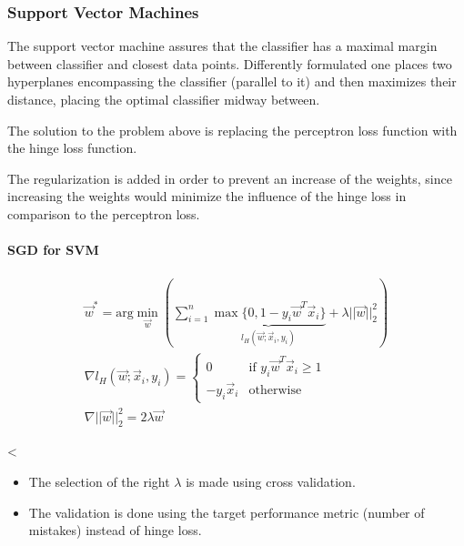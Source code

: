 \documentclass[8pt,a4paper]{scrartcl}
\newcommand{\Argmin}[2]{\text{arg}\underset{#1}{\min}\left(#2\right)}
\begin{document}
\begin{multicols*}{3}
\subsubsection{Support Vector Machines}

The support vector machine assures that the classifier has a maximal margin between classifier and closest data points. Differently formulated one places two hyperplanes encompassing the classifier (parallel to it) and then maximizes their distance, placing the optimal classifier midway between.

The solution to the problem above is replacing the perceptron loss function with the hinge loss function.


\importname{SVM}{$\vec{w}^\ast=\Argmin{\vec{w}}{\sum\limits_{i=1}^n\max\{0,1-y_i\vec{w}^T\vec{x}_i\}+\lambda||\vec{w}||_2^2}$}

The regularization is added in order to prevent an increase of the weights, since increasing the weights would minimize the influence of the hinge loss in comparison to the perceptron loss.

\paragraph{SGD for SVM}

\begin{align*}
\vec{w}^\ast=\Argmin{\vec{w}}{\sum\limits_{i=1}^n\underbrace{\max\{0,1-y_i\vec{w}^T\vec{x}_i\}}_{l_H(\vec{w};\vec{x}_i,y_i)}+\lambda||\vec{w}||_2^2}\\
\nabla l_H(\vec{w};\vec{x}_i,y_i)=\begin{cases}0& \text{if } y_i\vec{w}^T\vec{x}_i\geq 1\\-y_i\vec{x}_i&\text{otherwise}\end{cases}\\
\nabla||\vec{w}||_2^2 = 2\lambda\vec{w}
\end{align*}


<

\begin{itemize}
\ncompaq
\item The selection of the right $\lambda$ is made using cross validation.
\item The validation is done using the target performance metric (number of mistakes) instead of hinge loss.
\end{itemize}


\end{multicols*}
\end{document}
